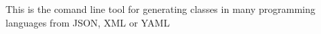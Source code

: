 \href{https://travis-ci.org/lnupmi11/CodeGen}{\tt }

This is the comand line tool for generating classes in many programming languages from J\+S\+ON, X\+ML or Y\+A\+ML 